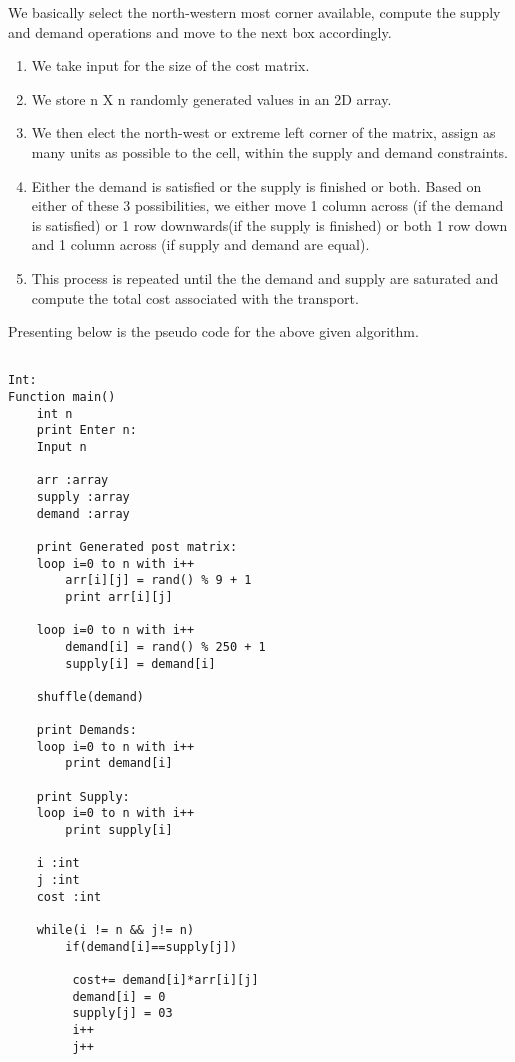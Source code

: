 \documentclass[10pt]{article}
\begin{document}
\begin{multicols*}{2}
We basically select the north-western most corner available, compute the supply and demand operations and move to the next box accordingly.

\begin{enumerate}
\item We take input for the size of the cost matrix.
\item We store n X n randomly generated values in an 2D array.
\item We then elect the north-west or extreme left corner of the matrix, assign as many units as possible to the cell, within the supply and demand constraints. 
\item Either the demand is satisfied or the supply is finished or both. Based on either of these 3 possibilities, we either move 1 column across (if the demand is satisfied) or 1 row downwards(if the supply is finished) or both 1 row down and 1 column across (if supply and demand are equal).
\item This process is repeated until the the demand and supply are saturated and compute the total cost associated with the transport.
\end{enumerate}

Presenting below is the pseudo code for the above given algorithm.


\begin{lstlisting}
    
Int:
Function main()
    int n
    print Enter n:
    Input n
    
    arr :array
    supply :array
    demand :array
    
    print Generated post matrix:
    loop i=0 to n with i++
        arr[i][j] = rand() % 9 + 1
        print arr[i][j]
        
    loop i=0 to n with i++
        demand[i] = rand() % 250 + 1
        supply[i] = demand[i]
    
    shuffle(demand)
    
    print Demands:
    loop i=0 to n with i++
        print demand[i]
        
    print Supply:
    loop i=0 to n with i++
        print supply[i]
    
    i :int
    j :int
    cost :int
    
    while(i != n && j!= n)
        if(demand[i]==supply[j])
        
		 cost+= demand[i]*arr[i][j]
		 demand[i] = 0
		 supply[j] = 03
		 i++
		 j++
		 	

\end{lstlisting}
\end{multicols*}
\end{document}
